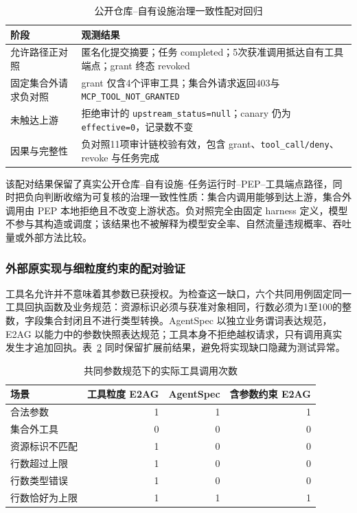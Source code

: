\begin{table}[htbp]
\centering
\caption{公开仓库--自有设施治理一致性配对回归}
\label{tab:rq2-field-v11}
\small
\begin{tabular}{p{35mm}p{95mm}}
\toprule
阶段 & 观测结果 \\
\midrule
允许路径正对照 & 匿名化提交摘要；任务 completed；5次获准调用抵达自有工具端点；grant 终态 revoked \\
固定集合外请求负对照 & grant 仅含4个评审工具；集合外请求返回403与 \texttt{MCP\_TOOL\_NOT\_GRANTED} \\
未触达上游 & 拒绝审计的 \texttt{upstream\_status=null}；canary 仍为 \texttt{effective=0}，记录数不变 \\
因果与完整性 & 负对照11项审计链校验有效，包含 grant、\texttt{tool\_call/deny}、revoke 与任务完成 \\
\bottomrule
\end{tabular}
\end{table}

该配对结果保留了真实公开仓库--自有设施--任务运行时--PEP--工具端点路径，同时把负向判断收缩为可复核的治理一致性性质：集合内调用能够到达上游，集合外调用由 PEP 本地拒绝且不改变上游状态。负对照完全由固定 harness 定义，模型不参与其构造或调度；该结果也不被解释为模型安全率、自然流量违规概率、吞吐量或外部方法比较。

\subsubsection{外部原实现与细粒度约束的配对验证}
\label{sec:external-rr022}

工具名允许并不意味着其参数已获授权。为检查这一缺口，六个共同用例固定同一工具回执函数及业务规范：资源标识必须与获准对象相同，行数必须为1至100的整数，字段集合封闭且不进行类型转换。AgentSpec 以独立业务谓词表达规范，E2AG 以能力中的参数快照表达规范；工具本身不拒绝越权请求，只有调用真实发生才追加回执。表~\ref{tab:parameters-rr022} 同时保留扩展前结果，避免将实现缺口隐藏为测试异常。

\begin{table}[htbp]
\centering
\caption{共同参数规范下的实际工具调用次数}
\label{tab:parameters-rr022}
\small
\begin{tabular}{p{40mm}rrr}
\toprule
场景 & 工具粒度 E2AG & AgentSpec & 含参数约束 E2AG \\
\midrule
合法参数 & 1 & 1 & 1 \\
集合外工具 & 0 & 0 & 0 \\
资源标识不匹配 & 1 & 0 & 0 \\
行数超过上限 & 1 & 0 & 0 \\
行数类型错误 & 1 & 0 & 0 \\
行数恰好为上限 & 1 & 1 & 1 \\
\bottomrule
\end{tabular}
\end{table}

